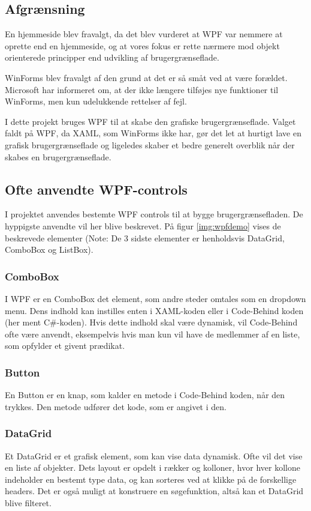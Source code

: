 \subsection{Afgrænsning}
En hjemmeside blev fravalgt, da det blev vurderet at WPF var nemmere at oprette end en hjemmeside, og at vores fokus er rette nærmere mod objekt orienterede principper end udvikling af brugergrænseflade.

WinForms blev fravalgt af den grund at det er så småt ved at være forældet.
Microsoft har informeret om, at der ikke længere tilføjes nye funktioner til WinForms, men kun udelukkende rettelser af fejl.\citep{winforms}

I dette projekt bruges WPF til at skabe den grafiske brugergrænseflade. 
Valget faldt på WPF, da XAML, som WinForms ikke har, gør det let at hurtigt lave en grafisk brugergrænseflade og ligeledes skaber et bedre generelt overblik når der skabes en brugergrænseflade.


\subsection{Ofte anvendte WPF-controls}
I projektet anvendes bestemte WPF controls til at bygge brugergrænsefladen. 
De hyppigste anvendte vil her blive beskrevet. 
På figur \ref{img:wpfdemo} vises de beskrevede elementer (Note: De 3 sidste elementer er henholdsvis DataGrid, ComboBox og ListBox).

\subsubsection*{ComboBox}
I WPF er en ComboBox det element, som andre steder omtales som en dropdown menu. 
Dens indhold kan instilles enten i XAML-koden eller i Code-Behind koden (her ment C\#-koden).
Hvis dette indhold skal være dynamisk, vil Code-Behind ofte være anvendt, eksempelvis hvis man kun vil have de medlemmer af en liste, som opfylder et givent prædikat. 

\subsubsection*{Button}
En Button er en knap, som kalder en metode i Code-Behind koden, når den trykkes. 
Den metode udfører det kode, som er angivet i den.

\subsubsection*{DataGrid}
Et DataGrid er et grafisk element, som kan vise data dynamisk.
Ofte vil det vise en liste af objekter.
Dets layout er opdelt i rækker og kolloner, hvor hver kollone indeholder en bestemt type data, og kan sorteres ved at klikke på de forskellige headers.
Det er også muligt at konstruere en søgefunktion, altså kan et DataGrid blive filteret.

